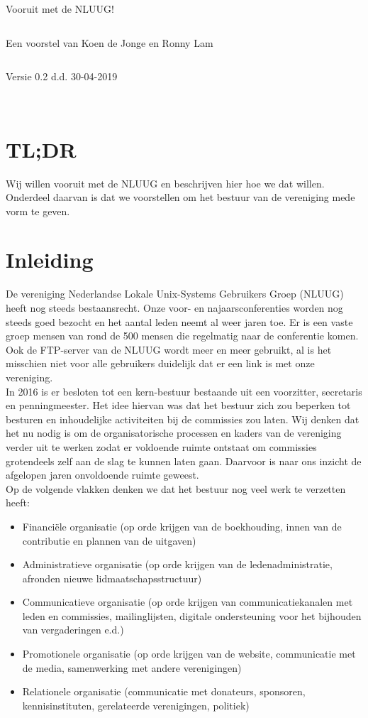 \documentclass{article}
\begin{document}
\centerline{\Huge Vooruit met de NLUUG!}
$ $\\
\centerline{\Large Een voorstel van Koen de Jonge en Ronny Lam}
$ $\\
\centerline{Versie 0.2 d.d. 30-04-2019} \\


\section{TL;DR}
Wij willen vooruit met de NLUUG en beschrijven hier hoe we dat 
willen. Onderdeel daarvan is dat we voorstellen om het bestuur van de vereniging mede vorm te geven.

\section{Inleiding}
De vereniging Nederlandse Lokale Unix-Systems Gebruikers Groep (NLUUG) heeft nog steeds bestaansrecht. Onze voor- en najaarsconferenties worden nog steeds goed  bezocht en het aantal leden neemt al weer jaren toe. Er is een vaste groep mensen van rond de 500 mensen die regelmatig naar de conferentie komen. Ook de FTP-server van de NLUUG wordt meer en meer gebruikt, al is het misschien niet voor alle gebruikers duidelijk dat er een link is met onze vereniging.\\

In 2016 is er besloten tot een kern-bestuur bestaande uit een voorzitter, secretaris en penningmeester. Het idee hiervan was dat het bestuur zich zou beperken tot besturen en inhoudelijke activiteiten bij de commissies zou laten. Wij denken dat het nu nodig is om de organisatorische processen en kaders van de vereniging verder uit te werken zodat er voldoende ruimte ontstaat om commissies grotendeels zelf aan de slag te kunnen laten gaan. Daarvoor is naar ons inzicht de afgelopen jaren onvoldoende ruimte geweest.\\

Op de volgende vlakken denken we dat het bestuur nog veel werk te verzetten heeft:
\begin{itemize}
    \item Financi\"ele organisatie (op orde krijgen van de boekhouding, innen van de contributie en plannen van de uitgaven)
    \item Administratieve organisatie (op orde krijgen van de ledenadministratie, afronden nieuwe lidmaatschapsstructuur)
    \item  Communicatieve organisatie (op orde krijgen van communicatiekanalen met leden en commissies, mailinglijsten, digitale ondersteuning voor het bijhouden van vergaderingen e.d.)
    \item Promotionele organisatie (op orde krijgen van de website, communicatie met de media, samenwerking met andere verenigingen)
    \item  Relationele organisatie (communicatie met donateurs, sponsoren, kennisinstituten, gerelateerde verenigingen, politiek)
\end{itemize}
\end{document}
